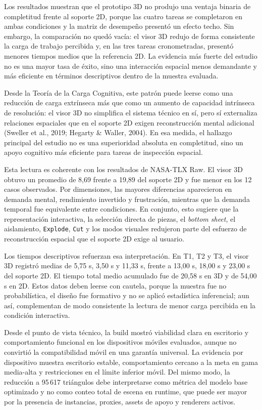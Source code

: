 Los resultados muestran que el prototipo 3D no produjo una ventaja binaria de completitud frente al soporte 2D, porque las cuatro tareas se completaron en ambas condiciones y la matriz de desempeño presentó un efecto techo. Sin embargo, la comparación no quedó vacía: el visor 3D redujo de forma consistente la carga de trabajo percibida y, en las tres tareas cronometradas, presentó menores tiempos medios que la referencia 2D. La evidencia más fuerte del estudio no es una mayor tasa de éxito, sino una interacción espacial menos demandante y más eficiente en términos descriptivos dentro de la muestra evaluada.

Desde la Teoría de la Carga Cognitiva, este patrón puede leerse como una reducción de carga extrínseca más que como un aumento de capacidad intrínseca de resolución: el visor 3D no simplifica el sistema técnico en sí, pero sí externaliza relaciones espaciales que en el soporte 2D exigen reconstrucción mental adicional (Sweller et al., 2019; Hegarty \& Waller, 2004). En esa medida, el hallazgo principal del estudio no es una superioridad absoluta en completitud, sino un apoyo cognitivo más eficiente para tareas de inspección espacial.

Esta lectura es coherente con los resultados de NASA-TLX Raw. El visor 3D obtuvo un promedio de 8,69 frente a 19,89 del soporte 2D y fue menor en los 12 casos observados. Por dimensiones, las mayores diferencias aparecieron en demanda mental, rendimiento invertido y frustración, mientras que la demanda temporal fue equivalente entre condiciones. En conjunto, esto sugiere que la representación interactiva, la selección directa de piezas, el \textit{bottom sheet}, el aislamiento, \texttt{Explode}, \texttt{Cut} y los modos visuales redujeron parte del esfuerzo de reconstrucción espacial que el soporte 2D exige al usuario.

Los tiempos descriptivos refuerzan esa interpretación. En T1, T2 y T3, el visor 3D registró medias de 5,75 s, 3,50 s y 11,33 s, frente a 13,00 s, 18,00 s y 23,00 s del soporte 2D. El tiempo total medio acumulado fue de 20,58 s en 3D y de 54,00 s en 2D. Estos datos deben leerse con cautela, porque la muestra fue no probabilística, el diseño fue formativo y no se aplicó estadística inferencial; aun así, complementan de modo consistente la lectura de menor carga percibida en la condición interactiva.

Desde el punto de vista técnico, la build mostró viabilidad clara en escritorio y comportamiento funcional en los dispositivos móviles evaluados, aunque no convirtió la compatibilidad móvil en una garantía universal. La evidencia por dispositivo muestra escritorio estable, comportamiento cercano a la meta en gama media-alta y restricciones en el límite inferior móvil. Del mismo modo, la reducción a 95\,617 triángulos debe interpretarse como métrica del modelo base optimizado y no como conteo total de escena en runtime, que puede ser mayor por la presencia de instancias, proxies, assets de apoyo y renderers activos.

